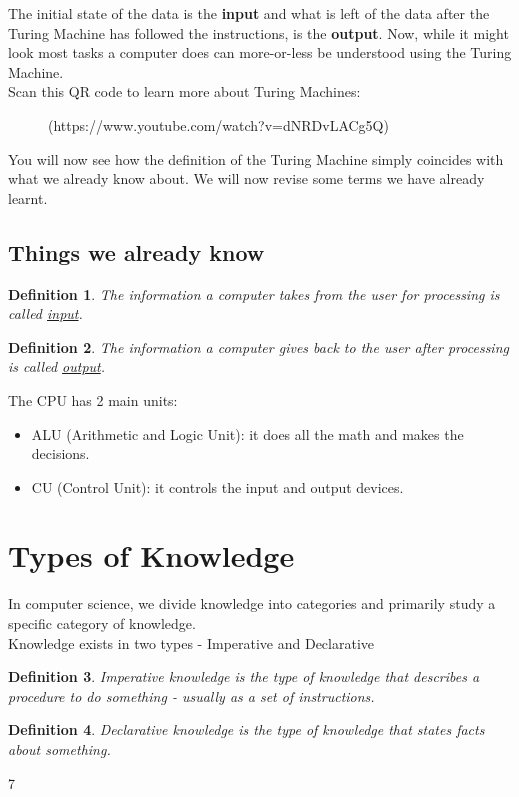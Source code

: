 \documentclass[letterpaper, 12pt]{book}
\newtheorem{definition}{Definition}
\begin{document}
The initial state of the data is the \textbf{input} and what is left of the data after the Turing Machine has followed the instructions, is the \textbf{output}.
Now, while it might look most tasks a computer does can more-or-less be understood using the Turing Machine.\\
Scan this QR code to learn more about Turing Machines:\\
\begin{figure}[h]
\centering
{}
\caption{(https://www.youtube.com/watch?v=dNRDvLACg5Q)}
\end{figure}
You will now see how the definition of the Turing Machine simply coincides with what we already know about. We will now revise some terms we have already learnt.
\subsection{Things we already know}
\begin{definition}
	The information a computer takes from the user for processing is called \underline{input}.
\end{definition}
\begin{definition}
	The information a computer gives back to the user after processing is called \underline{output}.
\end{definition}
The CPU has 2 main units:
\begin{itemize}
	\item ALU (Arithmetic and Logic Unit): it does all the math and makes the decisions.
	\item CU (Control Unit): it controls the input and output devices.
\end{itemize}
\section{Types of Knowledge}
In computer science, we divide knowledge into categories and primarily study a specific category of knowledge.\\
Knowledge exists in two types - Imperative and Declarative
\begin{definition}
Imperative knowledge is the type of knowledge that describes a procedure to do something - usually as a set of instructions.
\end{definition}
\begin{definition}
Declarative knowledge is the type of knowledge that states facts about something.
\end{definition}7
\end{document}
